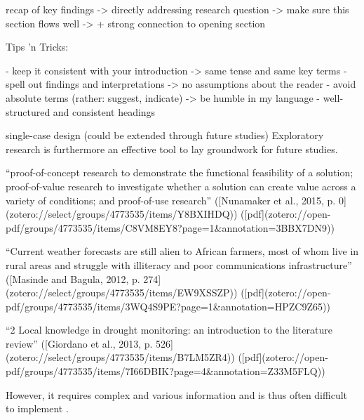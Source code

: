 
recap of key findings -> directly addressing research question
-> make sure this section flows well -> + strong connection to opening section

Tips 'n Tricks:

- keep it consistent with your introduction -> same tense and same key terms
- spell out findings and interpretations -> no assumptions about the reader
- avoid absolute terms (rather: suggest, indicate) -> be humble in my language
- well-structured and consistent headings





single-case design (could be extended through future studies)
Exploratory research is furthermore an effective tool to lay groundwork for future studies.

“proof-of-concept research to demonstrate the functional feasibility of a solution; proof-of-value research to investigate whether a solution can create value across a variety of conditions; and proof-of-use research” ([Nunamaker et al., 2015, p. 0](zotero://select/groups/4773535/items/Y8BXIHDQ)) ([pdf](zotero://open-pdf/groups/4773535/items/C8VM8EY8?page=1&annotation=3BBX7DN9))


“Current weather forecasts are still alien to African farmers, most of whom live in rural areas and struggle with illiteracy and poor communications infrastructure” ([Masinde and Bagula, 2012, p. 274](zotero://select/groups/4773535/items/EW9XSSZP)) ([pdf](zotero://open-pdf/groups/4773535/items/3WQ4S9PE?page=1&annotation=HPZC9Z65))


“2 Local knowledge in drought monitoring: an introduction to the literature review” ([Giordano et al., 2013, p. 526](zotero://select/groups/4773535/items/B7LM5ZR4)) ([pdf](zotero://open-pdf/groups/4773535/items/7I66DBIK?page=4&annotation=Z33M5FLQ))

However, it requires complex and various information and is thus often difficult to implement \autocite{liuWaterScarcityAssessments2017}.


